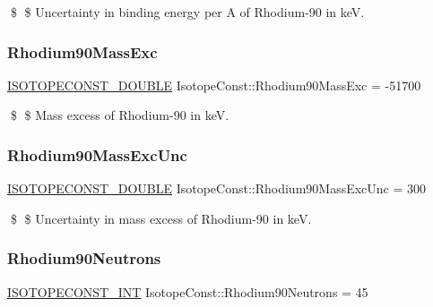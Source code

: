 \$ \$ Uncertainty in binding energy per A of Rhodium-\/90 in keV. \mbox{\label{group___isotope_const-_rhodium-_rh90_gaf4738de1ea7ff68724e1dd96d70b34d3}} 
\subsubsection{\texorpdfstring{Rhodium90\+Mass\+Exc}{Rhodium90MassExc}}
{\footnotesize\ttfamily \mbox{\hyperlink{group___isotope_const-_macros_ga8f45a7272ce02c0b4c65c44636ed719a}{I\+S\+O\+T\+O\+P\+E\+C\+O\+N\+S\+T\+\_\+\+D\+O\+U\+B\+LE}} Isotope\+Const\+::\+Rhodium90\+Mass\+Exc = -\/51700}

\$ \$ Mass excess of Rhodium-\/90 in keV. \mbox{\label{group___isotope_const-_rhodium-_rh90_gac4a891441ccd29e903047c7bb10352c2}} 
\subsubsection{\texorpdfstring{Rhodium90\+Mass\+Exc\+Unc}{Rhodium90MassExcUnc}}
{\footnotesize\ttfamily \mbox{\hyperlink{group___isotope_const-_macros_ga8f45a7272ce02c0b4c65c44636ed719a}{I\+S\+O\+T\+O\+P\+E\+C\+O\+N\+S\+T\+\_\+\+D\+O\+U\+B\+LE}} Isotope\+Const\+::\+Rhodium90\+Mass\+Exc\+Unc = 300}

\$ \$ Uncertainty in mass excess of Rhodium-\/90 in keV. \mbox{\label{group___isotope_const-_rhodium-_rh90_ga6461d4293dcbb788b1dc3f1106800faa}} 
\subsubsection{\texorpdfstring{Rhodium90\+Neutrons}{Rhodium90Neutrons}}
{\footnotesize\ttfamily \mbox{\hyperlink{group___isotope_const-_macros_ga5f18360b3e99483a35c32d789e62621c}{I\+S\+O\+T\+O\+P\+E\+C\+O\+N\+S\+T\+\_\+\+I\+NT}} Isotope\+Const\+::\+Rhodium90\+Neutrons = 45}

